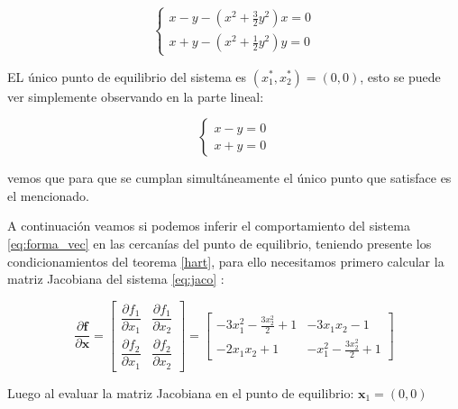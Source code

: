 \documentclass[10pt]{article}
\begin{document}
\begin{equation}
     \label{eq:problema1:pes}
      \left\{
	       \begin{array}{ll}
               x-y-(x^2 + \frac{3}{2}y^2)x=0\\[5pt] %
               x+y-(x^2 + \frac{1}{2}y^2)y=0

	       \end{array}
	     \right.
\end{equation}

EL único punto de equilibrio del sistema es $(x_{1}^{*},x_{2}^{*})=(0,0)$, esto se puede
ver simplemente observando en la parte lineal:

\begin{equation}
     \label{eq:problema1:pes:linear}
      \left\{
	       \begin{array}{ll}
               x-y=0\\[5pt] %
               x+y=0

	       \end{array}
	     \right.
\end{equation}

vemos que para que se cumplan simultáneamente el único punto que satisface es el mencionado.


A continuación veamos si podemos inferir el comportamiento del sistema \eqref{eq:forma_vec} en las cercanías del punto de equilibrio, teniendo presente los condicionamientos del teorema \ref{hart}, para ello necesitamos primero calcular la matriz Jacobiana del sistema \eqref{eq:jaco} :


\begin{equation}
\dfrac{\partial \mathbf{f}}{\partial \mathbf{x}}=
\begin{bmatrix}
 \dfrac{\partial f_1}{\partial x_1}& \dfrac{\partial f_1}{\partial x_2} \\ 
\dfrac{\partial f_2}{\partial x_1}& \dfrac{\partial f_2}{\partial x_2}
\end{bmatrix} 
=
\begin{bmatrix}
 -3 x_{1}^{2} - \frac{3 x_{2}^{2}}{2} + 1& - 3 x_{1} x_{2} - 1  \\
 - 2 x_{1} x_{2} + 1& - x_{1}^{2} - \frac{3 x_{2}^{2}}{2} + 1
\end{bmatrix}
\label{eq:jaco_sis}
\end{equation}


Luego al evaluar la matriz Jacobiana en el punto de equilibrio: $\mathbf{x}_1=(0,0)$
\end{document}
